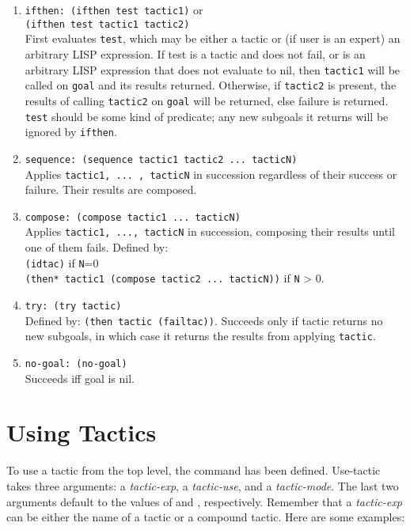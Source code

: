 \begin{enumerate}
\item {\tt ifthen: (ifthen test tactic1)} or \\
        {\tt (ifthen test tactic1 tactic2)}\\
First evaluates {\tt test}, which may be either a tactic or (if user is an expert) an arbitrary LISP expression.  If test is a tactic and does not fail, or is an arbitrary LISP expression that does not evaluate to nil, then {\tt tactic1} will be called on {\tt goal} and its results returned. Otherwise, if {\tt tactic2} is present, the results of calling {\tt tactic2} on {\tt goal} will be returned, else failure is returned.  {\tt test} should be some kind of predicate; any new subgoals it returns will be ignored by {\tt ifthen}.

\item {\tt sequence: (sequence tactic1 tactic2 ... tacticN)}\\
Applies {\tt tactic1, ... , tacticN} in succession regardless of their success or failure.  Their results are composed.

\item {\tt compose: (compose tactic1 ... tacticN)}\\
Applies {\tt tactic1, ..., tacticN} in succession, composing their results until one of them fails.  Defined by:\\
{\tt (idtac)} if {\tt N}=0\\
{\tt (then* tactic1 (compose tactic2 ... tacticN))} if {\tt N} > 0.

\item {\tt try: (try tactic)}\\
Defined by: {\tt (then tactic (failtac))}.  Succeeds only if tactic returns no new subgoals, in which case it returns the results from applying {\tt tactic}. 

\item {\tt no-goal: (no-goal)}\\
Succeeds iff goal is nil.
\end{enumerate}


\section{Using Tactics}

To use a tactic from the top level, the command  has
been defined.  Use-tactic takes three arguments: a {\it tactic-exp}, a 
{\it tactic-use},
and a {\it tactic-mode}.  The last two arguments default to the values of
 and , respectively.
Remember that a {\it tactic-exp} can be either the name of
a tactic or a compound tactic.  Here are some examples:

